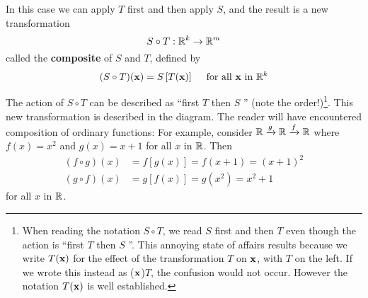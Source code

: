 \begin{wrapfigure}[7]{l}{5cm} 
\centering
\vspace*{-3em}

\end{wrapfigure}

In this case we can apply $T$ first and then apply $S$, and the result is a new transformation
\begin{equation*}
S \circ T : \mathbb{R}^{k} \rightarrow \mathbb{R}^{m}
\end{equation*}
called the \textbf{composite} of $S$ and $T$, defined by
\begin{equation*}
(S \circ T)(\textbf{x}) = S \left[ T(\textbf{x}) \right] \quad \mbox{ for all } \textbf{x} \mbox{ in } \mathbb{R}^{k}
\end{equation*}

The action of $S \circ T$ can be described as ``first $T$ then $S$ '' (note the order!)\footnote{When reading the notation $S \circ T$, we read $S$ first and then $T$ even though the action is ``first $T$ then $S$ ''. This annoying state of affairs results because we write $T(\textbf{x})$ for the effect of the transformation $T$ on $\textbf{x}$, with $T$ on the left. If we wrote this instead as ($\textbf{x}$)$T$, the confusion would not occur. However the notation $T(\textbf{x})$ is well established.}. This new transformation is described in the diagram. The reader will have encountered composition of ordinary functions: For example, consider $\mathbb{R} \xrightarrow{g} \mathbb{R} \xrightarrow{f} \mathbb{R}$ where $f(x) = x^{2}$ and $g(x) = x + 1$ for all $x$ in $\mathbb{R}$. Then
\begin{align*}
(f \circ g)(x) &= f \left[ g(x) \right] = f(x + 1) = (x + 1)^{2} \\
(g \circ f)(x) &= g \left[ f(x) \right] = g(x^{2}) = x^{2} + 1
\end{align*} for all $x$ in $\mathbb{R}$.


